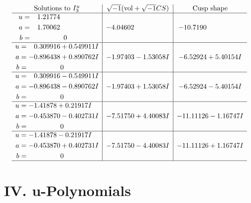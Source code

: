 \documentclass[1p]{elsarticle_modified}
\theoremstyle{definition}
\newcommand{\I}{\sqrt{-1}}
\begin{document}
$$\begin{array}{c|c|c}  
\text{Solutions to }I^u_{3}& \I (\text{vol} + \sqrt{-1}CS) & \text{Cusp shape}\\
 \hline 
\begin{aligned}
u &= \phantom{-}1.21774\phantom{ +0.000000I} \\
a &= \phantom{-}1.70062\phantom{ +0.000000I} \\
b &= \phantom{-0.000000 } 0\end{aligned}
 & -4.04602\phantom{ +0.000000I} & -10.7190\phantom{ +0.000000I} \\ \hline\begin{aligned}
u &= \phantom{-}0.309916 + 0.549911 I \\
a &= -0.896438 + 0.890762 I \\
b &= \phantom{-0.000000 } 0\end{aligned}
 & -1.97403 - 1.53058 I & -6.52924 + 5.40154 I \\ \hline\begin{aligned}
u &= \phantom{-}0.309916 - 0.549911 I \\
a &= -0.896438 - 0.890762 I \\
b &= \phantom{-0.000000 } 0\end{aligned}
 & -1.97403 + 1.53058 I & -6.52924 - 5.40154 I \\ \hline\begin{aligned}
u &= -1.41878 + 0.21917 I \\
a &= -0.453870 - 0.402731 I \\
b &= \phantom{-0.000000 } 0\end{aligned}
 & -7.51750 + 4.40083 I & -11.11126 - 1.16747 I \\ \hline\begin{aligned}
u &= -1.41878 - 0.21917 I \\
a &= -0.453870 + 0.402731 I \\
b &= \phantom{-0.000000 } 0\end{aligned}
 & -7.51750 - 4.40083 I & -11.11126 + 1.16747 I\\
 \hline 
 \end{array}$$\newpage
\newpage\renewcommand{\arraystretch}{1}
\centering \section*{ IV. u-Polynomials}
\end{document}
